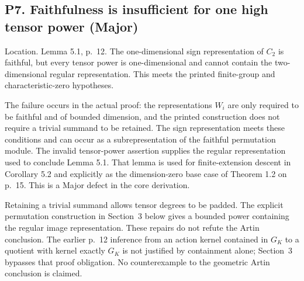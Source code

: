 \documentclass[10pt]{article}
\begin{document}
\subsection*{P7. Faithfulness is insufficient for one high tensor power (Major)}
Location. Lemma 5.1, p. 12. The one-dimensional sign representation of \(C_2\) is faithful, but every tensor power is one-dimensional and cannot contain the two-dimensional regular representation. This meets the printed finite-group and characteristic-zero hypotheses.\par
The failure occurs in the actual proof: the representations \(W_i\) are only required to be faithful and of bounded dimension, and the printed construction does not require a trivial summand to be retained. The sign representation meets these conditions and can occur as a subrepresentation of the faithful permutation module. The invalid tensor-power assertion supplies the regular representation used to conclude Lemma 5.1. That lemma is used for finite-extension descent in Corollary 5.2 and explicitly as the dimension-zero base case of Theorem 1.2 on p. 15. This is a Major defect in the core derivation.\par
Retaining a trivial summand allows tensor degrees to be padded. The explicit permutation construction in Section 3 below gives a bounded power containing the regular image representation. These repairs do not refute the Artin conclusion. The earlier p. 12 inference from an action kernel contained in \(G_K\) to a quotient with kernel exactly \(G_K\) is not justified by containment alone; Section 3 bypasses that proof obligation. No counterexample to the geometric Artin conclusion is claimed.\par
\end{document}
